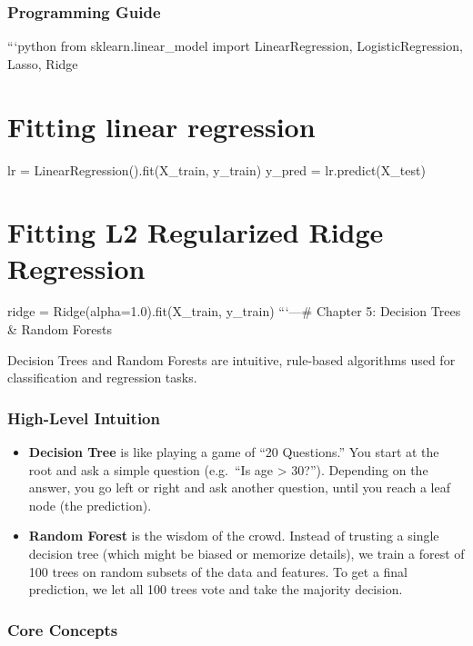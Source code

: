 \subsubsection{Programming Guide}\label{programming-guide-3}

```python from sklearn.linear\_model import LinearRegression,
LogisticRegression, Lasso, Ridge

\section{Fitting linear regression}\label{fitting-linear-regression}

lr = LinearRegression().fit(X\_train, y\_train) y\_pred =
lr.predict(X\_test)

\section{Fitting L2 Regularized Ridge
Regression}\label{fitting-l2-regularized-ridge-regression}

ridge = Ridge(alpha=1.0).fit(X\_train, y\_train) ```\n\n---\n\n\#
Chapter 5: Decision Trees \& Random Forests

Decision Trees and Random Forests are intuitive, rule-based algorithms
used for classification and regression tasks.

\subsubsection{High-Level Intuition}\label{high-level-intuition-4}

\begin{itemize}
\tightlist
\item
  \textbf{Decision Tree} is like playing a game of ``20 Questions.'' You
  start at the root and ask a simple question (e.g.~``Is age
  \textgreater{} 30?''). Depending on the answer, you go left or right
  and ask another question, until you reach a leaf node (the
  prediction).
\item
  \textbf{Random Forest} is the wisdom of the crowd. Instead of trusting
  a single decision tree (which might be biased or memorize details), we
  train a forest of 100 trees on random subsets of the data and
  features. To get a final prediction, we let all 100 trees vote and
  take the majority decision.
\end{itemize}

\subsubsection{Core Concepts}\label{core-concepts-1}

